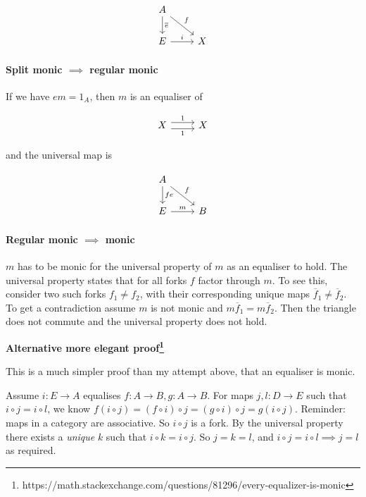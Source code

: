 \documentclass{article}
\begin{document}
\begin{equation*}
\begin{tikzcd}
A \arrow[rd,"f"] \arrow[d, "\overline{e}"] & \\
E \arrow[r,"i"] & X
\end{tikzcd}
\end{equation*}

\paragraph{Split monic $\implies$ regular monic}

If we have $em = 1_A$, then $m$ is an equaliser of

\begin{equation*}
\label{eqn5143}
\begin{tikzcd}
  X \ar[r,shift left=.75ex,"1"]
    \ar[r,shift right=.75ex,swap,"1"] & X
\end{tikzcd}
\end{equation*}

and the universal map is

\begin{equation*}
\begin{tikzcd}
A \arrow[rd,"f"] \arrow[d, "fe"] & \\
E \arrow[r,"m"] & B
\end{tikzcd}
\end{equation*}

\paragraph{Regular monic $\implies$ monic}

$m$ has to be monic for the universal property of $m$ as an equaliser to hold. The universal property states that for all forks $f$ factor through $m$. To see this, consider two such forks $f_1 \neq f_2$, with their corresponding unique maps $\overline{f}_1 \neq \overline{f}_2$. To get a contradiction assume $m$ is not monic and $m\overline{f}_1 = m\overline{f}_2$. Then the triangle does not commute and the universal property does not hold.

\textbf{Alternative more elegant proof\footnote{https://math.stackexchange.com/questions/81296/every-equalizer-is-monic}}

This is a much simpler proof than my attempt above, that an equaliser is monic.

Assume $i\colon E \rightarrow A$ equalises $f\colon A \rightarrow B, g\colon A \rightarrow B$.  For maps $j, l: D \rightarrow E$ such that $i \circ j = i \circ l$, we know $f (i \circ j) = (f \circ i) \circ j = (g \circ i) \circ j = g (i \circ j)$. Reminder: maps in a category are associative. So $i \circ j$ is a fork. By the universal property there exists a \textit{unique} $k$ such that $i \circ k = i \circ j$. So $j = k = l$, and $i \circ j = i \circ l \implies j = l$ as required.
\end{document}
